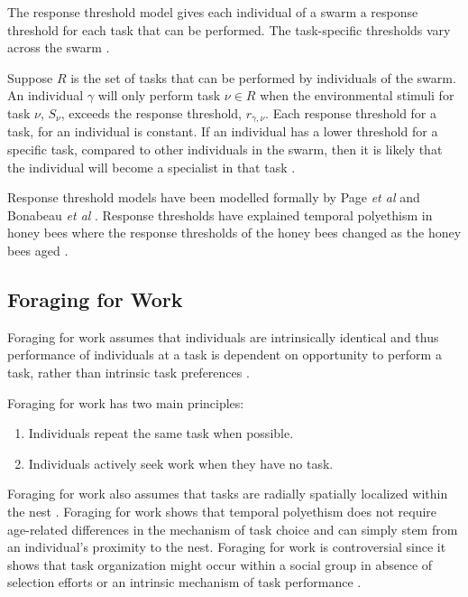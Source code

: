 The response threshold model gives each individual of a swarm a response threshold for each task that can be performed. The task-specific thresholds vary across the swarm \cite{robinson1989genetic}.

Suppose $R$ is the set of tasks that can be performed by individuals of the swarm. An individual $\gamma$ will only perform task $\nu \in R$ when the environmental stimuli for task $\nu$, $S_\nu$, exceeds the response threshold, $r_{\gamma,\nu}$. Each response threshold for a task, for an individual is constant. If an individual has a lower threshold for a specific task, compared to other individuals in the swarm, then it is likely that the individual will become a specialist in that task \cite{robinson1989genetic}.

Response threshold models have been modelled formally by Page \textit{et al} \cite{page1990self} and Bonabeau \textit{et al} \cite{bonabeau1999role}. Response thresholds have explained temporal polyethism in honey bees where the response thresholds of the honey bees changed as the honey bees aged \cite{robinson1987regulation}.

\subsection{Foraging for Work}
\label{foragingforwork}
Foraging for work assumes that individuals are intrinsically identical and thus performance of individuals at a task is dependent on opportunity to perform a task, rather than intrinsic task preferences \cite{franks1994foraging}.

Foraging for work has two main principles:
\begin{enumerate}
	\item Individuals repeat the same task when possible.
	\item Individuals actively seek work when they have no task.
\end{enumerate}


Foraging for work also assumes that tasks are radially spatially localized within the nest \cite{tofts1993algorithms}. Foraging for work shows that temporal polyethism does not require age-related differences in the mechanism of task choice and can simply stem from an individual's proximity to the nest. Foraging for work is controversial since it shows that task organization might occur within a social group in absence of selection efforts or an intrinsic mechanism of task performance \cite{franks1994foraging}. 

